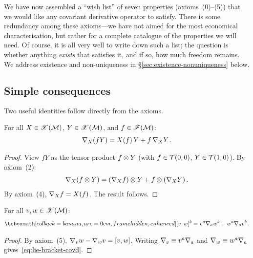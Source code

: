 \begin{remark}
  We have now assembled a ``wish list'' of seven properties
  (axioms~(0)--(5)) that we would like any covariant derivative
  operator to satisfy.  There is some redundancy among
  these axioms---we have not aimed for the most economical
  characterisation, but rather for a complete catalogue of
  the properties we will need.  Of course, it is all very well to
  write down such a list; the question is whether anything
  \emph{exists} that satisfies it, and if so, how much freedom
  remains.  We address existence and non-uniqueness in
  \S\ref{sec:existence-nonuniqueness} below.
\end{remark}

\subsection{Simple consequences}\label{sec:connection-consequences}

Two useful identities follow directly from the axioms.

\begin{theorem}\label{thm:leibniz-fY}
  For all $X\in\mathscr{X}(\mathcal{M})$,
  $Y\in\mathscr{X}(\mathcal{M})$, and $f\in\mathscr{F}(\mathcal{M})$:
  \begin{equation}\label{eq:leibniz-fY}
    \nabla_X(fY) = X(f)\,Y + f\,\nabla_X Y\,.
  \end{equation}
\end{theorem}

\begin{proof}
  View $fY$ as the tensor product
  $f\otimes Y$ (with $f\in\mathcal{T}(0,0)$, $Y\in\mathcal{T}(1,0)$).
  By axiom~(2):
  \[
    \nabla_X(f\otimes Y) = (\nabla_X f)\otimes Y + f\otimes(\nabla_X Y)\,.
  \]
  By axiom~(4), $\nabla_X f = X(f)$.  The result follows.
\end{proof}

\begin{theorem}\label{thm:lie-bracket-covd}
  For all $v,w\in\mathscr{X}(\mathcal{M})$:
  \begin{equation}\label{eq:lie-bracket-covd}
    \eqbox{[v,w]^b = v^a\covd_a w^b - w^a\covd_a v^b}\,.
  \end{equation}
\end{theorem}

\begin{proof}
  By axiom~(5), $\nabla_v w - \nabla_w v = [v,w]$.  Writing
  $\nabla_v \equiv v^a\nabla_a$ and $\nabla_w \equiv w^a\nabla_a$
  gives~\eqref{eq:lie-bracket-covd}.
\end{proof}

